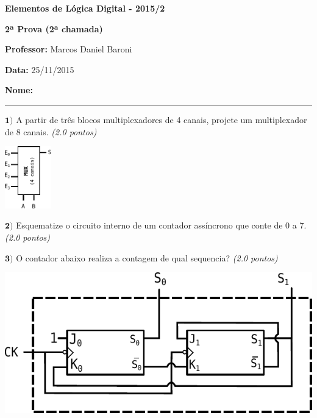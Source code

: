 \documentclass[12pt]{article}
\newcommand{\exerc}[3]{ \vspace*{25pt} {$\mathbf{#1)}$} #2 \hfill {\it #3} }
\begin{document}

\begin{center}
{\Large \bf Elementos de Lógica Digital - 2015/2}
\end{center}
\vspace{2pt}

{\large \bf 2ª Prova (2ª chamada)}

{\bf Professor:} Marcos Daniel Baroni

{\bf Data:} 25/11/2015

\vspace{2pt}
{\bf Nome:} \rule[-2mm]{130mm}{1pt}

\exerc{1}{A partir de três blocos multiplexadores de 4 canais, projete um
  multiplexador de 8 canais.}{(2.0 pontos)}
  \begin{center}
		  \includegraphics[width=20mm]{mux4}
  \end{center}

\vspace{-10pt}
\exerc{2}{Esquematize o circuito interno de um contador assíncrono que conte de 0 a 7.}{(2.0 pontos)}

\exerc{3}{O contador abaixo realiza a contagem de qual sequencia?}{(2.0 pontos)}
\begin{center}
  \includegraphics[scale=0.6]{cont1} \\ \vspace{15pt}
\end{center}
\end{document}
